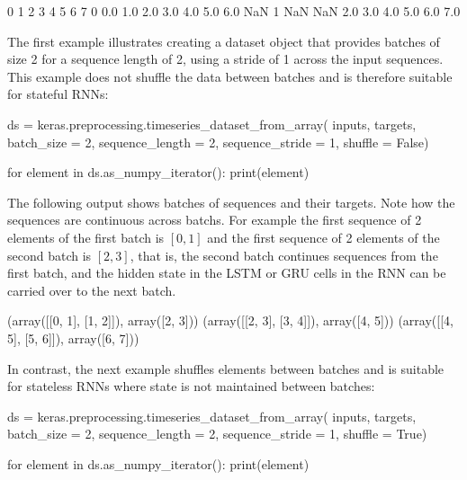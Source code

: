 \begin{samepage}
\begin{textcode}
     0    1    2    3    4    5    6    7
0  0.0  1.0  2.0  3.0  4.0  5.0  6.0  NaN
1  NaN  NaN  2.0  3.0  4.0  5.0  6.0  7.0
\end{textcode}
\end{samepage}

The first example illustrates creating a dataset object that provides batches of size 2 for a sequence length of 2, using a stride of 1 across the input sequences. This example does not shuffle the data between batches and is therefore suitable for stateful RNNs:

\begin{samepage}
\begin{pythoncode}
ds = keras.preprocessing.timeseries_dataset_from_array(
     inputs, 
     targets,
     batch_size = 2, 
     sequence_length = 2, 
     sequence_stride = 1, 
     shuffle = False)
     
for element in ds.as_numpy_iterator():
     print(element)
\end{pythoncode}
\end{samepage}

The following output shows batches of sequences and their targets. Note how the sequences are continuous across batchs. For example the first sequence of 2 elements of the first batch is $[0, 1]$ and the first sequence of 2 elements of the second batch is $[2, 3]$, that is, the second batch continues sequences from the first batch, and the hidden state in the LSTM or GRU cells in the RNN can be carried over to the next batch. 
 
\begin{samepage}
\begin{textcode}
(array([[0, 1],
       [1, 2]]), array([2, 3]))
(array([[2, 3],
       [3, 4]]), array([4, 5]))
(array([[4, 5],
       [5, 6]]), array([6, 7]))
\end{textcode}
\end{samepage}

In contrast, the next example shuffles elements between batches and is suitable for stateless RNNs where state is not maintained between batches:

\begin{samepage}
\begin{pythoncode}
ds = keras.preprocessing.timeseries_dataset_from_array(
     inputs, 
     targets, 
     batch_size = 2, 
     sequence_length = 2, 
     sequence_stride = 1, 
     shuffle = True)
     
for element in ds.as_numpy_iterator():
     print(element)
\end{pythoncode}
\end{samepage}

